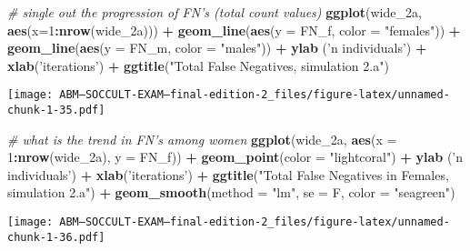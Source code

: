 \documentclass[]{article}
\newenvironment{Shaded}{\begin{snugshade}}{\end{snugshade}}
\newcommand{\KeywordTok}[1]{\textcolor[rgb]{0.13,0.29,0.53}{\textbf{#1}}}
\newcommand{\DataTypeTok}[1]{\textcolor[rgb]{0.13,0.29,0.53}{#1}}
\newcommand{\DecValTok}[1]{\textcolor[rgb]{0.00,0.00,0.81}{#1}}
\newcommand{\StringTok}[1]{\textcolor[rgb]{0.31,0.60,0.02}{#1}}
\newcommand{\CommentTok}[1]{\textcolor[rgb]{0.56,0.35,0.01}{\textit{#1}}}
\newcommand{\OperatorTok}[1]{\textcolor[rgb]{0.81,0.36,0.00}{\textbf{#1}}}
\newcommand{\NormalTok}[1]{#1}
\begin{document}
\begin{Shaded}
\begin{Highlighting}[]
\CommentTok{# single out the progression of FN's (total count values)}
\KeywordTok{ggplot}\NormalTok{(wide_2a, }\KeywordTok{aes}\NormalTok{(}\DataTypeTok{x=}\DecValTok{1}\OperatorTok{:}\KeywordTok{nrow}\NormalTok{(wide_2a))) }\OperatorTok{+}\StringTok{ }
\StringTok{  }\KeywordTok{geom_line}\NormalTok{(}\KeywordTok{aes}\NormalTok{(}\DataTypeTok{y =}\NormalTok{ FN_f, }\DataTypeTok{color =} \StringTok{"females"}\NormalTok{)) }\OperatorTok{+}
\StringTok{  }\KeywordTok{geom_line}\NormalTok{(}\KeywordTok{aes}\NormalTok{(}\DataTypeTok{y =}\NormalTok{ FN_m, }\DataTypeTok{color =} \StringTok{"males"}\NormalTok{)) }\OperatorTok{+}
\StringTok{  }\KeywordTok{ylab}\NormalTok{ (}\StringTok{'n individuals'}\NormalTok{) }\OperatorTok{+}\StringTok{ }\KeywordTok{xlab}\NormalTok{(}\StringTok{'iterations'}\NormalTok{) }\OperatorTok{+}
\StringTok{  }\KeywordTok{ggtitle}\NormalTok{(}\StringTok{"Total False Negatives, simulation 2.a"}\NormalTok{)}
\end{Highlighting}
\end{Shaded}

\texttt{[image: ABM---SOCCULT-EXAM---final-edition-2\_files/figure-latex/unnamed-chunk-1-35.pdf]}

\begin{Shaded}
\begin{Highlighting}[]
\CommentTok{# what is the trend in FN's among women}
\KeywordTok{ggplot}\NormalTok{(wide_2a, }\KeywordTok{aes}\NormalTok{(}\DataTypeTok{x =} \DecValTok{1}\OperatorTok{:}\KeywordTok{nrow}\NormalTok{(wide_2a), }\DataTypeTok{y =}\NormalTok{ FN_f)) }\OperatorTok{+}\StringTok{ }
\StringTok{  }\KeywordTok{geom_point}\NormalTok{(}\DataTypeTok{color =} \StringTok{"lightcoral"}\NormalTok{) }\OperatorTok{+}
\StringTok{  }\KeywordTok{ylab}\NormalTok{ (}\StringTok{'n individuals'}\NormalTok{) }\OperatorTok{+}\StringTok{ }\KeywordTok{xlab}\NormalTok{(}\StringTok{'iterations'}\NormalTok{) }\OperatorTok{+}
\StringTok{  }\KeywordTok{ggtitle}\NormalTok{(}\StringTok{"Total False Negatives in Females, simulation 2.a"}\NormalTok{) }\OperatorTok{+}
\StringTok{  }\KeywordTok{geom_smooth}\NormalTok{(}\DataTypeTok{method =} \StringTok{"lm"}\NormalTok{, }\DataTypeTok{se =}\NormalTok{ F, }\DataTypeTok{color =} \StringTok{"seagreen"}\NormalTok{)}
\end{Highlighting}
\end{Shaded}

\texttt{[image: ABM---SOCCULT-EXAM---final-edition-2\_files/figure-latex/unnamed-chunk-1-36.pdf]}
\end{document}
